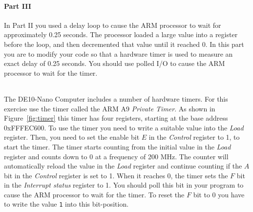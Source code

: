 \documentclass[epsfig,10pt,fullpage]{article}
\begin{document}
~\\
\noindent
{\bf Part III}
~\\
~\\
\noindent
In Part II you used a delay loop to cause the ARM processor to wait for approximately 0.25 
seconds. The processor loaded a large value into a register before the loop, and then 
decremented that value until it reached 0.  In this part you are to modify your code so that a
hardware timer is used to measure an exact delay of 0.25 seconds. You should use polled I/O to
cause the ARM processor to wait for the timer.

~\\
\noindent
The DE10-Nano Computer includes a number of hardware timers. For this exercise use the timer
called the ARM A9 {\it Private Timer}. As shown in Figure~\ref{fig:timer} this timer has 
four registers, starting at the base address {\sf 0xFFFEC600}. To use the timer you need
to write a suitable value into the {\it Load} register. Then, you need to set the enable
bit $E$ in the {\it Control} register to 1, to start the timer. The timer starts counting from
the initial value in the {\it Load} register and counts down to 0 at a frequency of 200 MHz. 
The counter will automatically reload the value in the {\it Load} register and continue counting 
if the $A$ bit in the {\it Control} register is set to 1.  When it reaches 0, the timer sets 
the $F$ bit in the {\it Interrupt status} register to 1.
You should poll this bit in your program to cause the ARM processor to wait for the timer. 
To reset the $F$ bit to 0 you have to write the value \texttt{1} into this bit-position. 
\end{document}
